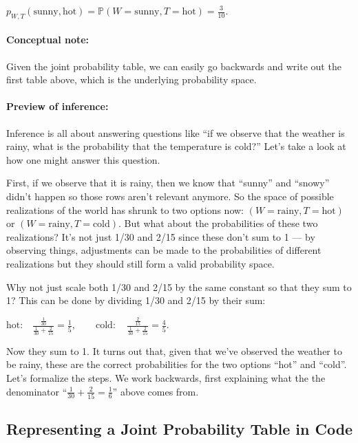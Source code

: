 \documentclass[6008notes.tex]{subfiles}
\begin{document}
{\centering$p_{W,T}(\text {sunny},\text {hot})=\mathbb {P}(W=\text {sunny},T=\text {hot})=\frac{3}{10}.$ \par}
 
\paragraph{Conceptual note:} Given the joint probability table, we can easily go backwards and write out the first table above, which is the underlying probability space.

\paragraph{Preview of inference:} Inference is all about answering questions like ``if we observe that the weather is rainy, what is the probability that the temperature is cold?'' Let's take a look at how one might answer this question.

First, if we observe that it is rainy, then we know that ``sunny'' and ``snowy'' didn't happen so those rows aren't relevant anymore. So the space of possible realizations of the world has shrunk to two options now: $(W=\text {rainy},T=\text {hot})$ or $(W=\text {rainy},T=\text {cold})$. But what about the probabilities of these two realizations? It's not just 1/30 and 2/15 since these don't sum to 1 --- by observing things, adjustments can be made to the probabilities of different realizations but they should still form a valid probability space.

Why not just scale both 1/30 and 2/15 by the same constant so that they sum to 1? This can be done by dividing 1/30 and 2/15 by their sum:

{\centering$\text {hot:}\quad \frac{\frac{1}{30}}{\frac{1}{30}+\frac{2}{15}}=\frac{1}{5},\qquad 
 \text {cold}:\quad \frac{\frac{2}{15}}{\frac{1}{30}+\frac{2}{15}}=\frac{4}{5}.$ \par}
 
Now they sum to 1. It turns out that, given that we've observed the weather to be rainy, these are the correct probabilities for the two options ``hot'' and ``cold''. Let's formalize the steps. We work backwards, first explaining what the the denominator ``$\frac{1}{30}+\frac{2}{15}=\frac{1}{6}$'' above comes from.

\subsection{Representing a Joint Probability Table in Code}
\end{document}
